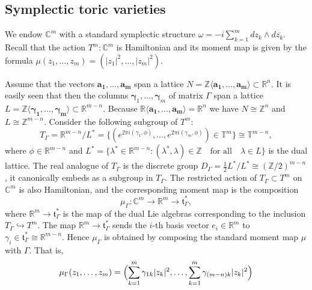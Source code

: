 \documentclass[jsg]{IP_v1_forauthors}
\theoremstyle{definition}
\numberwithin{equation}{section}
\begin{document}
\subsection{Symplectic toric varieties}
We endow ${\mathbb C}^m$ with a standard symplectic structure $\omega= - i \sum_{k=1}^m dz_k \wedge d\overline{z_k}$. Recall that the action $T^m \colon {\mathbb C}^m$ is Hamiltonian and its moment map is given by the formula $ \mu(z_1,\ldots,z_m)=(|z_1|^2,\ldots,|z_m|^2) $.

Assume that the vectors $\boldsymbol{a_1},\ldots,\boldsymbol{a_m}$ span a lattice $N={\mathbb Z}\langle \boldsymbol{a_1},\ldots,\boldsymbol{a_m} \rangle \subset {\mathbb R}^n$. It is easily seen that then the columns $\boldsymbol{\gamma}_1,\ldots,\boldsymbol{\gamma}_m$ of matrix $\Gamma$ span a lattice $L={\mathbb Z}\langle \boldsymbol{\gamma_1},\ldots,\boldsymbol{\gamma_m} \rangle \subset {\mathbb R}^{m-n}$. Because ${\mathbb R} \langle  \boldsymbol{a_1},\ldots,\boldsymbol{a_m} \rangle =   {\mathbb R} ^n$ we have $N  \cong {\mathbb Z}^n$ and $L \cong  {\mathbb Z}^{m-n}$. Consider the following subgroup of $T^m$:
\begin{equation}
T_\Gamma={\mathbb R} ^{m-n} / L^*= \{(e^{2\pi i (\gamma_1,\phi)},\dots,e^{2\pi i (\gamma_m,\phi)}) \in {\mathbb T}^m \} \cong {\mathbb T}^{m-n},
\end{equation}
where $\phi \in {\mathbb R}^{m-n} $ and $L^* = \{ \lambda^* \in {\mathbb R}^{m-n} \colon (\lambda^*,\lambda) \in  {\mathbb Z} \quad \text{for all} \quad \lambda \in L\}$
is the dual lattice. The real analogue of $T_\Gamma$ is the discrete group $D_\Gamma = \frac{1}{2} L^* /L^* \cong ({\mathbb Z}/2)^{m-n}$, it canonically embeds as a subgroup in $T_{\Gamma}$. The restricted action of $T_\Gamma \subset T^m$ on ${\mathbb C}^m$ is also Hamiltonian, and the corresponding moment map is the composition
\begin{equation} 
\mu_\Gamma \colon {\mathbb C}^m \rightarrow {\mathbb R}^m \rightarrow \mathfrak{t}^{*}_\Gamma,
\end{equation}
where $ {\mathbb R}^m \rightarrow \mathfrak{t}^*_\Gamma$ is the map of the dual Lie algebras corresponding to the inclusion $T_\Gamma \hookrightarrow T^m$.
The map $ {\mathbb R}^m \rightarrow \mathfrak{t}^*_\Gamma$  sends the $i$-th basis vector $e_i \in {\mathbb R}^m$ to $\gamma_i \in \mathfrak{t}^*_\Gamma \cong {\mathbb R}^{m-n}$. Hence $\mu_\Gamma$ is obtained by composing the standard moment map $\mu$ with $\Gamma$. That is,
\begin{equation}
\mu_\Gamma(z_1,\ldots,z_m)= \Bigl( \sum_{k=1}^m \gamma_{1k}|z_k|^2,\ldots,\sum_{k=1}^m \gamma_{(m-n) k}|z_k|^2 \Bigr)
\end{equation}
\end{document}
